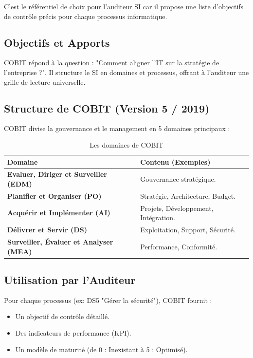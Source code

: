 C'est le référentiel de choix pour l'auditeur SI car il propose une liste d'objectifs de contrôle précis pour chaque processus informatique.

\subsection{Objectifs et Apports}

COBIT répond à la question : "Comment aligner l'IT sur la stratégie de l'entreprise ?".
Il structure le SI en domaines et processus, offrant à l'auditeur une grille de lecture universelle.

\subsection{Structure de COBIT (Version 5 / 2019)}

COBIT divise la gouvernance et le management en 5 domaines principaux :

\begin{table}[h!]
\centering
\footnotesize
\setlength{\tabcolsep}{3pt}
\begin{tabular}{p{3cm}p{8cm}}
    \toprule
    \textbf{Domaine} & \textbf{Contenu (Exemples)} \\
    \midrule
    \textbf{Evaluer, Diriger et Surveiller (EDM)} & Gouvernance stratégique. \\
    \midrule
    \textbf{Planifier et Organiser (PO)} & Stratégie, Architecture, Budget. \\
    \midrule
    \textbf{Acquérir et Implémenter (AI)} & Projets, Développement, Intégration. \\
    \midrule
    \textbf{Délivrer et Servir (DS)} & Exploitation, Support, Sécurité. \\
    \midrule
    \textbf{Surveiller, Évaluer et Analyser (MEA)} & Performance, Conformité. \\
    \bottomrule
\end{tabular}
\caption{Les domaines de COBIT}
\end{table}

\subsection{Utilisation par l'Auditeur}

Pour chaque processus (ex: DS5 "Gérer la sécurité"), COBIT fournit :
\begin{itemize}
    \item Un objectif de contrôle détaillé.
    \item Des indicateurs de performance (KPI).
    \item Un modèle de maturité (de 0 : Inexistant à 5 : Optimisé).
\end{itemize}

